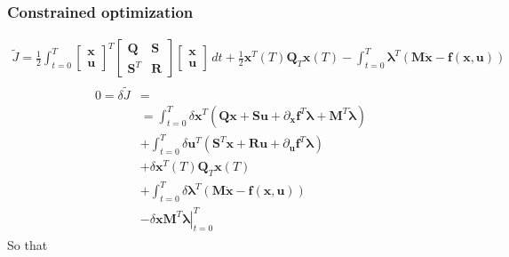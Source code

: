 \documentclass[letterpaper,10pt,english]{jupyterBook}
\begin{document}
\subsubsection*{Constrained optimization}
\begin{equation*}
\begin{split}\widetilde{J} = \frac{1}{2} \int_{t=0}^{T} \begin{bmatrix} \mathbf{x} \\ \mathbf{u} \end{bmatrix}^T \begin{bmatrix}  \mathbf{Q} & \mathbf{S} \\ \mathbf{S}^T & \mathbf{R} \end{bmatrix} \begin{bmatrix} \mathbf{x} \\ \mathbf{u} \end{bmatrix} \, dt + \frac{1}{2} \mathbf{x}^T(T) \mathbf{Q}_T \mathbf{x}(T) - \int_{t=0}^{T} \boldsymbol\lambda^T \left( \mathbf{M} \dot{\mathbf{x}} - \mathbf{f}(\mathbf{x}, \mathbf{u}) \right) \end{split}
\end{equation*}\begin{equation*}
\begin{split}\begin{aligned}
  0 = \delta \widetilde{J} 
  & = \\
  & = \int_{t=0}^{T} \delta \mathbf{x}^T \left( \mathbf{Q}   \mathbf{x} + \mathbf{S} \mathbf{u} + \partial_{\mathbf{x}} \mathbf{f}^T \boldsymbol\lambda + \mathbf{M}^T \dot{\boldsymbol{\lambda}}\right) \\
  & + \int_{t=0}^{T} \delta \mathbf{u}^T \left( \mathbf{S}^T \mathbf{x} + \mathbf{R} \mathbf{u} + \partial_{\mathbf{u}} \mathbf{f}^T \boldsymbol\lambda \right) \\
  & + \delta \mathbf{x}^T(T) \mathbf{Q}_T \mathbf{x}(T) \\
  & + \int_{t=0}^{T} \delta \boldsymbol\lambda^T ( \mathbf{M} \dot{\mathbf{x}} - \mathbf{f}(\mathbf{x}, \mathbf{u}) ) \\
  & - \left. \delta \mathbf{x} \mathbf{M}^T \boldsymbol\lambda \right|_{t=0}^{T}
\end{aligned}\end{split}
\end{equation*}
\sphinxAtStartPar
So that
\end{document}

